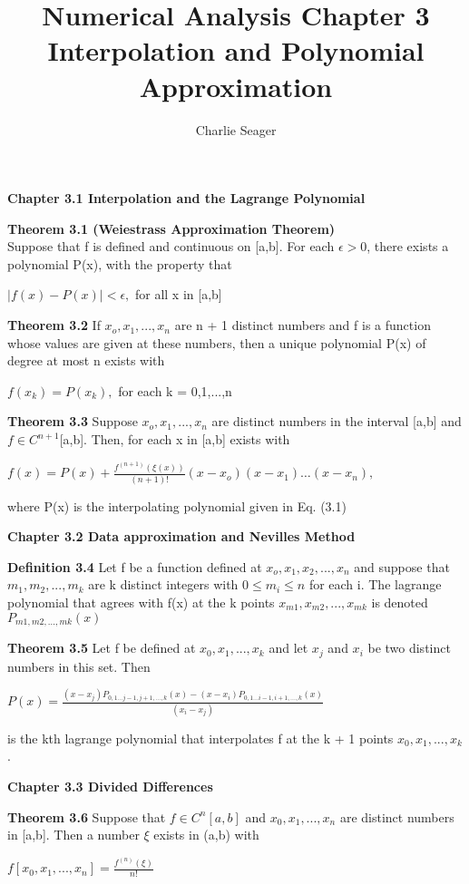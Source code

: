 \documentclass{article}
\begin{document}
\title {Numerical Analysis Chapter 3 Interpolation and Polynomial Approximation}

\author{Charlie Seager}

\textbf {Chapter 3.1 Interpolation and the Lagrange Polynomial}

\textbf {Theorem 3.1 (Weiestrass Approximation Theorem)} \\
Suppose that f is defined and continuous on [a,b]. For each $\epsilon > 0$, there exists a polynomial P(x), with the property that 
\begin{center}
$|f(x) - P(x)| < \epsilon,$    for all x in [a,b]
\end{center}

\textbf {Theorem 3.2} If $x_o, x_1,..., x_n$ are n + 1 distinct numbers and f is a function whose values are given at these numbers, then a unique polynomial P(x) of degree at most n exists with
\begin{center}
$f(x_k)=P(x_k),$ for each k = 0,1,...,n
\end{center}

\textbf {Theorem 3.3} Suppose $x_o, x_1,...,x_n$ are distinct numbers in the interval [a,b] and $f \in C^{n+1}$[a,b]. Then, for each x in [a,b] exists with 
\begin{center}
$f(x) = P(x) + \frac{f^{(n+1)}(\xi(x))}{(n+1)!} (x-x_o)(x-x_1)\dots (x-x_n),$
\end{center}
where P(x) is the interpolating polynomial given in Eq. (3.1)

\textbf{Chapter 3.2 Data approximation and Nevilles Method}

\textbf {Definition 3.4} Let f be a function defined at $x_o, x_1, x_2,...,x_n$ and suppose that $m_1, m_2, ..., m_k$ are k distinct integers with $0 \leq m_i \leq n$ for each i. The lagrange polynomial that agrees with f(x) at the k points $x_{m1}, x_{m2},..., x_{mk}$ is denoted $P_{m1, m2,...,mk}(x)$

\textbf {Theorem 3.5} Let f be defined at $x_0, x_1, ..., x_k$ and let $x_j$ and $x_i$ be two distinct numbers in this set. Then 
\begin{center}
$P(x) = \frac{(x-x_j) P_{0,1...j-1, j+1,...,k}(x) -(x-x_i)P_{0,1...i-1, i+1,...,k}(x)}{(x_i - x_j)}$
\end{center}
is the kth lagrange polynomial that interpolates f at the k + 1 points $x_0, x_1,..., x_k$.

\textbf {Chapter 3.3 Divided Differences}

\textbf {Theorem 3.6} Suppose that $f \in C^n [a,b]$ and $x_0, x_1,...,x_n$ are distinct numbers in [a,b]. Then a number $\xi$ exists in (a,b) with
\begin{center}
$f[x_0, x_1,...,x_n] = \frac{f^{(n)} (\xi)}{n!}$
\end{center}
\end{document}
